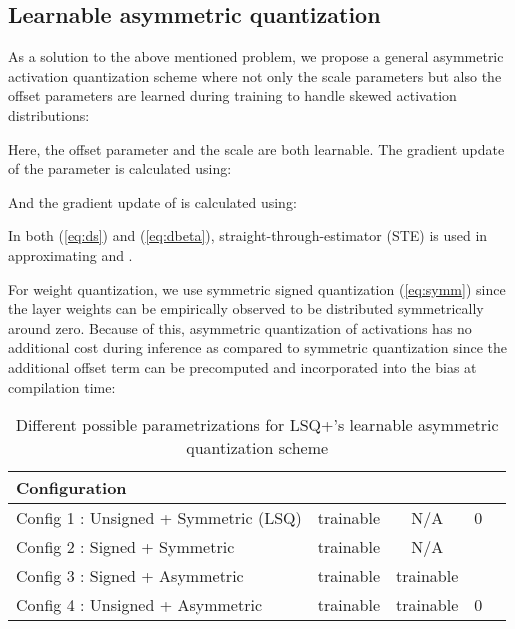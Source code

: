 \documentclass[10pt,twocolumn,letterpaper]{article}
\begin{document}
\subsection{Learnable asymmetric quantization}
\label{sec:asymm_formulation}
As a solution to the above mentioned problem, we propose a general asymmetric activation quantization scheme where not only the scale parameters but also the offset parameters are learned during training to handle skewed activation distributions:


Here, the offset parameter  and the scale  are both learnable.
The gradient update of the parameter  is calculated using:

And the gradient update of  is calculated using:

In both (\ref{eq:ds}) and (\ref{eq:dbeta}), straight-through-estimator (STE) \cite{straight_through} is used in approximating  and .

For weight quantization, we use symmetric signed quantization (\ref{eq:symm}) since the layer weights can be empirically observed to be distributed symmetrically around zero. Because of this, asymmetric quantization of activations has no additional cost during inference as compared to symmetric quantization since the additional offset term can be precomputed and incorporated into the bias at compilation time:


\begin{table*}[t]
	\caption{Different possible parametrizations for LSQ+'s learnable asymmetric quantization scheme}
\centering
	\begin{tabular}{l | c| c | c | c}
        \toprule
        	{Configuration} & {} & {} & {} & {} \\
			
			\midrule
	
			Config 1 : Unsigned + Symmetric (LSQ) & trainable & N/A & 0 & \\
			Config 2 : Signed + Symmetric & trainable & N/A &  &   \\
			Config 3 : Signed + Asymmetric & trainable & trainable &  &  \\
			Config 4 : Unsigned + Asymmetric & trainable & trainable & 0 &  \\
        \bottomrule
	\end{tabular}
	\label{configurations}
\end{table*}
\end{document}
